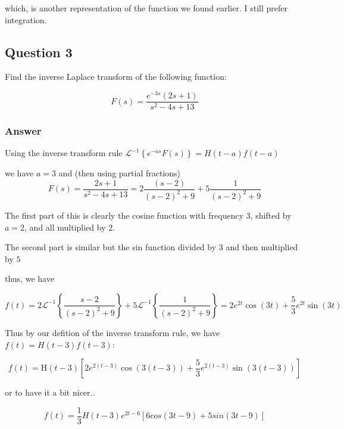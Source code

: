 \documentclass{article}
\begin{document}
which, is another representation of the function we found earlier. I still prefer integration.


\subsection*{Question 3}

Find the inverse Laplace transform of the following function:

$$F(s) = \frac{e^{-3s}\left(2s+1\right)}{s^2-4s+13}$$

\subsubsection*{Answer}
Using the inverse transform rule $\mathcal{L}^{-1}\left\{e^{-as}F\left(s\right)\right\}=H\left(t-a\right)f\left(t-a\right)$

we have $a=3$ and (then using partial fractions)
$$F(s) = \frac{2s+1}{s^2-4s+13} = 2 \frac{(s-2)}{\left(s-2\right)^2+9}+5\frac{1}{\left(s-2\right)^2+9}$$

The first part of this is clearly the cosine function with frequency $3$, shifted by $a=2$, and all multiplied by $2$.

The second part is similar but the sin function divided by $3$ and then multiplied by $5$

thus, we have

$$f(t) = 2\mathcal{L}^{-1}\left\{\frac{s-2}{\left(s-2\right)^2+9}\right\}+5\mathcal{L}^{-1}\left\{\frac{1}{\left(s-2\right)^2+9}\right\} = 2e^{2t}\cos \left(3t\right)+\frac{5}{3}e^{2t}\sin \left(3t\right)$$

Thus by our defition of the inverse transform rule, we have $f(t) = H(t-3)f(t-3)$:

$$f(t) = \text{H}\left(t-3\right)\left[2e^{2\left(t-3\right)}\cos \left(3\left(t-3\right)\right)+\frac{5}{3}e^{2\left(t-3\right)}\sin \left(3\left(t-3\right)\right)\right]$$

or to have it a bit nicer..

$$f(t) = \frac{1}{3} H(t-3) e^{2t-6} \left[6cos\left(3t-9\right)+5sin\left(3t-9\right)\right]$$
\end{document}
